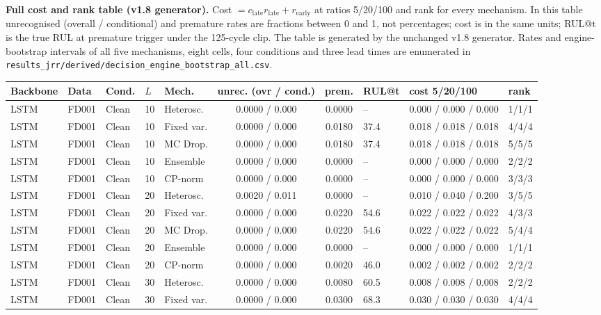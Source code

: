 \documentclass[10pt,a4paper]{article}
\begin{document}
\begin{landscape}
\noindent\textbf{Full cost and rank table (v1.8 generator).} Cost $=c_{\mathrm{late}}r_{\mathrm{late}}+r_{\mathrm{early}}$ at ratios 5/20/100 and rank for every mechanism. In this table unrecognised (overall / conditional) and premature rates are fractions between 0 and 1, not percentages; cost is in the same units; RUL@t is the true RUL at premature trigger under the 125-cycle clip. The table is generated by the unchanged v1.8 generator. Rates and engine-bootstrap intervals of all five mechanisms, eight cells, four conditions and three lead times are enumerated in \texttt{results\_jrr/derived/decision\_engine\_bootstrap\_all.csv}.
\begin{center}\scriptsize
\begin{longtable}{lllllcclll}
\toprule Backbone & Data & Cond. & $L$ & Mech. & unrec. (ovr / cond.) & prem. & RUL@t & cost 5/20/100 & rank \\ \midrule \endhead
LSTM & FD001 & Clean & 10 & Heterosc. & 0.0000 / 0.000 & 0.0000 & -- & 0.000 / 0.000 / 0.000 & 1/1/1 \\
LSTM & FD001 & Clean & 10 & Fixed var. & 0.0000 / 0.000 & 0.0180 & 37.4 & 0.018 / 0.018 / 0.018 & 4/4/4 \\
LSTM & FD001 & Clean & 10 & MC Drop. & 0.0000 / 0.000 & 0.0180 & 37.4 & 0.018 / 0.018 / 0.018 & 5/5/5 \\
LSTM & FD001 & Clean & 10 & Ensemble & 0.0000 / 0.000 & 0.0000 & -- & 0.000 / 0.000 / 0.000 & 2/2/2 \\
LSTM & FD001 & Clean & 10 & CP-norm & 0.0000 / 0.000 & 0.0000 & -- & 0.000 / 0.000 / 0.000 & 3/3/3 \\
LSTM & FD001 & Clean & 20 & Heterosc. & 0.0020 / 0.011 & 0.0000 & -- & 0.010 / 0.040 / 0.200 & 3/5/5 \\
LSTM & FD001 & Clean & 20 & Fixed var. & 0.0000 / 0.000 & 0.0220 & 54.6 & 0.022 / 0.022 / 0.022 & 4/3/3 \\
LSTM & FD001 & Clean & 20 & MC Drop. & 0.0000 / 0.000 & 0.0220 & 54.6 & 0.022 / 0.022 / 0.022 & 5/4/4 \\
LSTM & FD001 & Clean & 20 & Ensemble & 0.0000 / 0.000 & 0.0000 & -- & 0.000 / 0.000 / 0.000 & 1/1/1 \\
LSTM & FD001 & Clean & 20 & CP-norm & 0.0000 / 0.000 & 0.0020 & 46.0 & 0.002 / 0.002 / 0.002 & 2/2/2 \\
LSTM & FD001 & Clean & 30 & Heterosc. & 0.0000 / 0.000 & 0.0080 & 60.5 & 0.008 / 0.008 / 0.008 & 2/2/2 \\
LSTM & FD001 & Clean & 30 & Fixed var. & 0.0000 / 0.000 & 0.0300 & 68.3 & 0.030 / 0.030 / 0.030 & 4/4/4 \\

\end{longtable}
\end{center}
\end{landscape}
\end{document}
